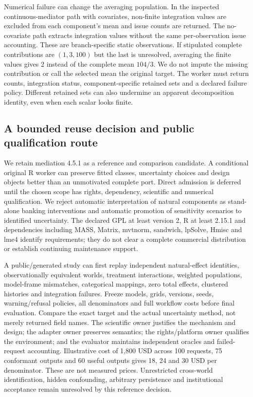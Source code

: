 Numerical failure can change the averaging population. In the inspected
continuous-mediator path with covariates, non-finite integration values are
excluded from each component's mean and issue counts are returned. The
no-covariate path extracts integration values without the same per-observation
issue accounting. These are branch-specific static observations. If stipulated
complete contributions are $(1,3,100)$ but the last is unresolved, averaging
the finite values gives 2 instead of the complete mean $104/3$. We do not
impute the missing contribution or call the selected mean the original target.
The worker must return counts, integration status, component-specific retained
sets and a declared failure policy. Different retained sets can also undermine
an apparent decomposition identity, even when each scalar looks finite.
\citep{exec24_mediation_sources,exec24_mediation_contract}

\subsection{A bounded reuse decision and public qualification route}
We retain mediation 4.5.1 as a reference and comparison candidate. A conditional
original R worker can preserve fitted classes, uncertainty choices and design
objects better than an unmotivated complete port. Direct admission is deferred
until the chosen scope has rights, dependency, scientific and numerical
qualification. We reject automatic interpretation of natural components as
stand-alone banking interventions and automatic promotion of sensitivity
scenarios to identified uncertainty. The declared GPL at least version 2,
R at least 2.15.1 and dependencies including MASS, Matrix, mvtnorm, sandwich,
lpSolve, Hmisc and lme4 identify requirements; they do not clear a complete
commercial distribution or establish continuing maintenance support.
\citep{exec24_mediation_sources,exec24_mediation_contract}

A public/generated study can first replay independent natural-effect
identities, observationally equivalent worlds, treatment interactions,
weighted populations, model-frame mismatches, categorical mappings, zero total
effects, clustered histories and integration failures. Freeze models, grids,
versions, seeds, warning/refusal policies, all denominators and full workflow
costs before final evaluation. Compare the exact target and the actual
uncertainty method, not merely returned field names. The scientific owner
justifies the mechanism and design; the adapter owner preserves semantics;
the rights/platform owner qualifies the environment; and the evaluator
maintains independent oracles and failed-request accounting. Illustrative
cost of 1,800 USD across 100 requests, 75 conformant outputs and 60 useful
outputs gives 18, 24 and 30 USD per denominator. These are not measured prices.
Unrestricted cross-world identification, hidden confounding, arbitrary
persistence and institutional acceptance remain unresolved by this reference
decision.\citep{exec24_mediation_contract}
